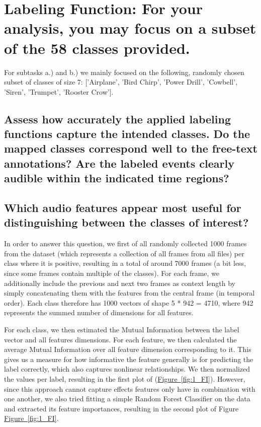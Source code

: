 
\section{Labeling Function: {\normalfont\normalsize For your analysis, you may focus on a subset of the 58 classes provided.}}
\label{sec:Labeling Function}

For subtasks a.) and b.) we mainly focused on the following, randomly chosen subset of classes of size 7: ['Airplane', 'Bird Chirp', 'Power Drill', 'Cowbell', 'Siren', 'Trumpet', 'Rooster Crow'].


\subsection{Assess how accurately the applied labeling functions capture the intended classes. Do the mapped classes correspond well to the free-text annotations? Are the labeled events clearly audible within the indicated time regions?}
\label{sec:Labeling Function:a}


\subsection{Which audio features appear most useful for distinguishing between the classes of interest? }
\label{sec:Labeling Function:b}

In order to answer this question, we first of all randomly collected 1000 frames from the dataset (which represents a collection of all frames from all files) per class where it is positive, resulting in a total of around 7000 frames (a bit less, since some frames contain multiple of the classes). For each frame, we additionally include the previous and next two frames as context length by simply concatenating them with the features from the central frame (in temporal order). Each class therefore has 1000 vectors of shape 5 * 942 = 4710, where 942 represents the summed number of dimensions for all features.

For each class, we then estimated the Mutual Information between the label vector and all features dimensions. For each feature, we then calculated the average Mutual Information over all feature dimension corresponding to it. This gives us a measure for how informative the feature generally is for predicting the label correctly, which also captures nonlinear relationships. We then normalized the values per label, resulting in the first plot of (\hyperref[fig:1_FI]{Figure~\ref*{fig:1_FI}}). However, since this approach cannot capture effects features only have in combination with one another, we also tried fitting a simple Random Forest Classifier on the data and extracted its feature importances, resulting in the second plot of Figure \hyperref[fig:1_FI]{Figure~\ref*{fig:1_FI}}.

